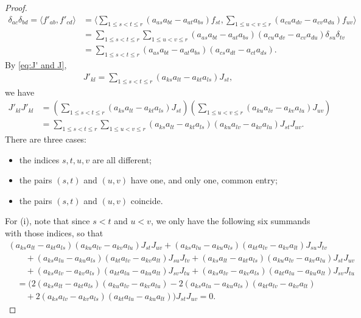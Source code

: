 \documentclass[10pt,a4paper]{amsart}
\numberwithin{equation}{section}
\begin{document}
\begin{proof}
\begin{align}
\delta_{ac}\delta_{bd}=\langle f'_{ab},f'_{cd}\rangle& =\bigg\langle \sum_{1\leq s< t\leq r}(a_{as}a_{bt} -a_{at}a_{bs})f_{st},
\sum_{1\leq u< v\leq r}(a_{cu}a_{dv} -a_{cv}a_{du})f_{uv}\bigg\rangle \nonumber\\
 &=\sum_{1\leq s< t\leq r}\sum_{1\leq u< v\leq r}(a_{as}a_{bt} -a_{at}a_{bs})
(a_{cu}a_{dv} -a_{cv}a_{du})\delta_{su}\delta_{tv}\nonumber\\
 &=\sum_{1\leq s< t\leq r}(a_{as}a_{bt} -a_{at}a_{bs})(a_{cs}a_{dt} -a_{ct}a_{ds}). \label{eq:orthononality-ext2}
\end{align}
By \eqref{eq:J' and J},
\begin{gather*}
 J'_{kl} = \sum_{1\leq s< t\leq r}(a_{ks}a_{lt} -a_{kt}a_{ls})J_{st},
\end{gather*}
we have
\begin{align*}
 J'_{kl} J'_{kl} &= \left(\sum_{1\leq s< t\leq r}(a_{ks}a_{lt} -a_{kt}a_{ls})
J_{st}\right) \left(\sum_{1\leq u< v\leq r}(a_{ku}a_{lv} -a_{kv}a_{lu})J_{uv}\right)\\
 &=\sum_{1\leq s< t\leq r}\sum_{1\leq u< v\leq r}(a_{ks}a_{lt} -a_{kt}a_{ls})(a_{ku}a_{lv} -a_{kv}a_{lu})J_{st}J_{uv}.
\end{align*}
There are three cases:
\begin{itemize}\itemsep=0pt
 \item[(i)] the indices $s,t,u,v$ are all different;
 \item[(ii)] the pairs $(s,t)$ and $(u,v)$ have one, and only one, common entry;
 \item[(iii)] the pairs $(s,t)$ and $(u,v)$ coincide.
\end{itemize}

For (i), note that since $s<t$ and $u<v$, we only have the following six summands with those indices, so that
\begin{gather*}
 (a_{k s} a_{l t} - a_{k t} a_{l s}) (a_{k u} a_{l v} - a_{k v} a_{l u}) J_{s t} J_{u v}
+ (a_{k s} a_{l u} - a_{k u} a_{l s}) (a_{k t} a_{l v} - a_{k v} a_{l t}) J_{s u} J_{t v} \\
\qquad {} + (a_{k s} a_{l u} - a_{k u} a_{l s})
 (a_{k t} a_{l v} - a_{k v} a_{l t}) J_{s u} J_{t v} + (a_{k s} a_{l t} - a_{k t} a_{l s})
 (a_{k u} a_{l v} - a_{k v} a_{l u}) J_{s t} J_{u v} \\
\qquad {} + (a_{k s} a_{l v} - a_{k v} a_{l s})
 (a_{k t} a_{l u} - a_{k u} a_{l t}) J_{s v} J_{t u}
+ (a_{k s} a_{l v} - a_{k v} a_{l s})
 (a_{k t} a_{l u} - a_{k u} a_{l t}) J_{s v} J_{t u}\\
\quad{} = (2(a_{ks}a_{lt}-a_{kt}a_{ls})(a_{ku}a_{lv}-a_{kv}a_{lu}) -2(a_{ks}a_{lu}-a_{ku}a_{ls})(a_{kt}a_{l v }-a_{kv}a_{lt})\\
 \qquad{} +2(a_{ks}a_{lv}-a_{kv}a_{ls})(a_{kt}a_{lu}-a_{ku}a_{lt}))J_{s t} J_{u v} = 0.
\end{gather*}


\end{proof}
\end{document}
